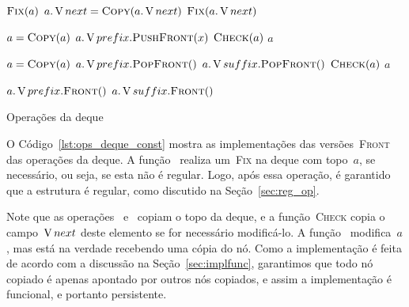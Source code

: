\documentclass[main.tex]{subfiles}
\begin{document}
\begin{algorithm}
\begin{algorithmic}[1]

        \State $\Call{Fix}{a}$
        \State $a.\V{next} = \Call{Copy}{a.\V{next}}$
        \State $\Call{Fix}{a.\V{next}}$
    \EndIf
\EndFunction

    \State $a = \Call{Copy}{a}$
    \State $a.\V{prefix}.\Call{PushFront}{x}$
    \State $\Call{Check}{a}$
    \State \Return $a$
\EndFunction

    \State $a = \Call{Copy}{a}$
        \State $a.\V{prefix}.\Call{PopFront}{\null}$
    \Else
        \State $a.\V{suffix}.\Call{PopFront}{\null}$
    \EndIf
    \State $\Call{Check}{a}$
    \State \Return $a$
\EndFunction

        \State \Return $a.\V{prefix}.\Call{Front}{\null}$
    \Else
        \State \Return $a.\V{suffix}.\Call{Front}{\null}$
    \EndIf
\EndFunction

\end{algorithmic}
\caption{Operações da deque} \label{lst:ops_deque_const}
\end{algorithm}

O Código~\ref{lst:ops_deque_const} mostra as implementações das versões~\textsc{Front} das operações da deque. A função~ realiza um~\textsc{Fix} na deque com topo~$a$, se necessário, ou seja, se esta não é regular. Logo, após essa operação, é garantido que a estrutura é regular, como discutido na Seção~\ref{sec:reg_op}.

Note que as operações~ e~ copiam o topo da deque, e a função~\textsc{Check} copia o campo~$\operatorname{V}{next}$ deste elemento se for necessário modificá-lo. A função~ modifica~$a$, mas está na verdade recebendo uma cópia do nó. Como a implementação é feita de acordo com a discussão na Seção~\ref{sec:implfunc}, garantimos que todo nó copiado é apenas apontado por outros nós copiados, e assim a implementação é funcional, e portanto persistente.
\end{document}
